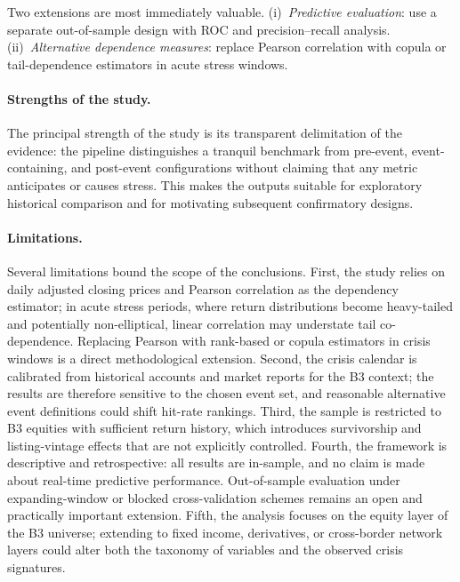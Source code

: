 \documentclass[a4paper,fleqn,review]{cas-sc}
\begin{document}
Two extensions are most immediately valuable. (i)~\emph{Predictive evaluation}: use a separate out-of-sample design with ROC and precision--recall analysis. (ii)~\emph{Alternative dependence measures}: replace Pearson correlation with copula or tail-dependence estimators in acute stress windows.

\paragraph{Strengths of the study.}


The principal strength of the study is its transparent delimitation of the evidence: the pipeline distinguishes a tranquil benchmark from pre-event, event-containing, and post-event configurations without claiming that any metric anticipates or causes stress. This makes the outputs suitable for exploratory historical comparison and for motivating subsequent confirmatory designs.

\paragraph{Limitations.}

Several limitations bound the scope of the conclusions. First, the study relies on daily adjusted closing prices and Pearson correlation as the dependency estimator; in acute stress periods, where return distributions become heavy-tailed and potentially non-elliptical, linear correlation may understate tail co-dependence. Replacing Pearson with rank-based or copula estimators in crisis windows is a direct methodological extension. Second, the crisis calendar is calibrated from historical accounts and market reports for the B3 context; the results are therefore sensitive to the chosen event set, and reasonable alternative event definitions could shift hit-rate rankings. Third, the sample is restricted to B3 equities with sufficient return history, which introduces survivorship and listing-vintage effects that are not explicitly controlled. Fourth, the framework is descriptive and retrospective: all results are in-sample, and no claim is made about real-time predictive performance. Out-of-sample evaluation under expanding-window or blocked cross-validation schemes remains an open and practically important extension. Fifth, the analysis focuses on the equity layer of the B3 universe; extending to fixed income, derivatives, or cross-border network layers could alter both the taxonomy of variables and the observed crisis signatures.
\end{document}
